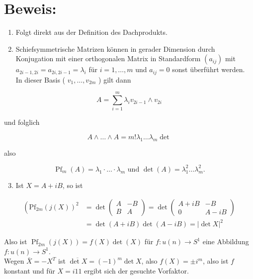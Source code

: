 \documentclass[10pt, letterpaper]{article}
\begin{document}
\section*{Beweis:}
\begin{enumerate}
  \item Folgt direkt aus der Definition des Dachprodukts.
  \item Schiefsymmetrische Matrizen können in gerader Dimension durch Konjugation mit einer orthogonalen Matrix in Standardform $\left(a_{i j}\right)$ mit $a_{2 i-1,2 i}= a_{2 i, 2 i-1}=\lambda_{i}$ für $i=1, \ldots, m$ und $a_{i j}=0$ sonst überführt werden.\\
In dieser Basis ( $v_{1}, \ldots, v_{2 m}$ ) gilt dann
\end{enumerate}

$$
A=\sum_{i=1}^{m} \lambda_{i} v_{2 i-1} \wedge v_{2 i}
$$

und folglich

$$
A \wedge \ldots \wedge A=m!\lambda_{1} \ldots \lambda_{m} \operatorname{det}
$$

also

$$
\operatorname{Pf}_{m}(A)=\lambda_{1} \cdot \ldots \cdot \lambda_{m} \text { und } \operatorname{det}(A)=\lambda_{1}^{2} \ldots \lambda_{m}^{2} .
$$

\begin{enumerate}
  \setcounter{enumi}{2}
  \item Ist $X=A+i B$, so ist
\end{enumerate}

$$
\begin{aligned}
\left(\mathrm{Pf}_{2 m}(j(X))^{2}\right. & =\operatorname{det}\left(\begin{array}{cc}
A & -B \\
B & A
\end{array}\right)=\operatorname{det}\left(\begin{array}{cc}
A+i B & -B \\
0 & A-i B
\end{array}\right) \\
& =\operatorname{det}(A+i B) \operatorname{det}(A-i B)=|\operatorname{det} X|^{2}
\end{aligned}
$$

Also ist $\operatorname{Pf}_{2 m}(j(X))=f(X) \operatorname{det}(X)$ für $f: u(n) \rightarrow S^{1}$ eine Abbildung $f: u(n) \rightarrow S^{1}$.\\
Wegen $\bar{X}=-X^{T}$ ist $\overline{\operatorname{det} X}=(-1)^{m} \operatorname{det} X$, also $f(X)= \pm i^{m}$, also ist $f$ konstant und für $X=i 11$ ergibt sich der gesuchte Vorfaktor.
\end{document}
